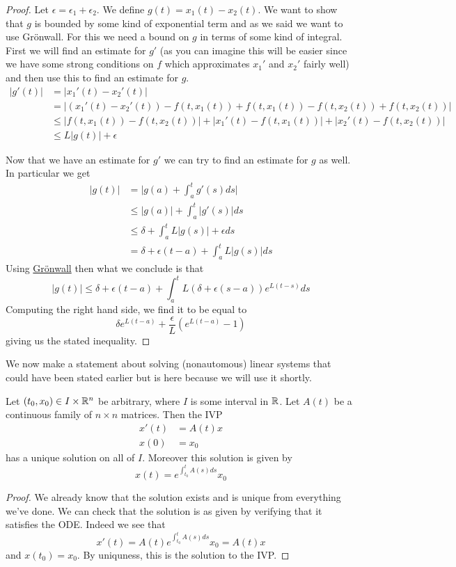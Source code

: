 \begin{proof}
    Let $\epsilon = \epsilon_1 + \epsilon_2$. We define $g(t) = x_1(t) - x_2(t)$. We want to show that $g$ is bounded by some kind of exponential term and as we said we want to use Grönwall. For this we need a bound on $g$ in terms of some kind of integral. First we will find an estimate for $g'$ (as you can imagine this will be easier since we have some strong conditions on $f$ which approximates $x_1'$ and $x_2'$ fairly well) and then use this to find an estimate for $g$.
    \begin{align*}
        |g'(t)| &= |x_1'(t) - x_2'(t)|\\
        &= | (x_1'(t) - x_2'(t)) - f(t, x_1(t)) + f(t, x_1(t)) - f(t, x_2(t)) + f(t, x_2(t)) |\\
        &\leq |f(t, x_1(t)) - f(t, x_2(t))| + | x_1'(t) - f(t, x_1(t)) | + |x_2'(t) - f(t, x_2(t))|\\
        &\leq L |g(t)| + \epsilon
    \end{align*}
    
    Now that we have an estimate for $g'$ we can try to find an estimate for $g$ as well. In particular we get
    \begin{align*}
        |g(t)| &= \bigg| g(a) + \int_a^t g'(s) ds \bigg|\\
        &\leq |g(a)| + \int_a^t|g'(s)| ds\\
        &\leq \delta + \int_a^t L |g(s)| + \epsilon ds\\
        &= \delta + \epsilon(t - a) + \int_a^t L |g(s)| ds
    \end{align*}
    Using \hyperref[thm:big-gronwall]{Grönwall} then what we conclude is that
    $$ |g(t)| \leq \delta + \epsilon(t - a) + \int_a^t L(\delta + \epsilon(s - a)) e^{L(t - s)} ds $$
    Computing the right hand side, we find it to be equal to
    $$ \delta e^{L(t - a)} + \frac{\epsilon}{L} (e^{L(t - a)} - 1) $$
    giving us the stated inequality.
\end{proof}

We now make a statement about solving (nonautomous) linear systems that could have been stated earlier but is here because we will use it shortly.
\begin{corollary}\label{cor:cont-mat-exist}
Let $(t_0, x_0) \in I \times \mathbb{R}^n$ be arbitrary, where $I$ is some interval in $\mathbb{R}$. Let $A(t)$ be a continuous family of $n \times n$ matrices. Then the IVP
\begin{align*}
    x'(t) &= A(t)x\\
    x(0) &= x_0
\end{align*}
has a unique solution on all of $I$. Moreover this solution is given by
$$ x(t) = e^{\int_{t_0}^t A(s) ds} x_0 $$
\end{corollary}
\begin{proof}
    We already know that the solution exists and is unique from everything we've done. We can check that the solution is as given by verifying that it satisfies the ODE. Indeed we see that
    $$ x'(t) = A(t) e^{\int_{t_0}^t A(s) ds} x_0 = A(t) x $$
    and $x(t_0) = x_0$. By uniquness, this is the solution to the IVP.
\end{proof}

